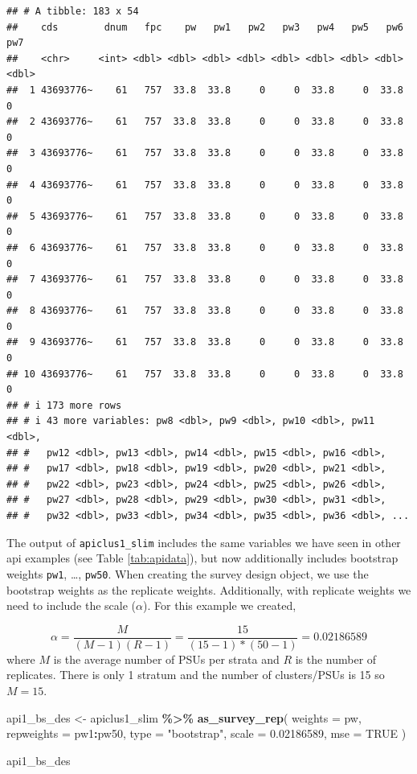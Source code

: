 \documentclass[
]{krantz}
\makeatletter
\newenvironment{Shaded}{\begin{snugshade}}{\end{snugshade}}
\newcommand{\AttributeTok}[1]{\textcolor[rgb]{0.27,0.27,0.27}{#1}}
\newcommand{\ConstantTok}[1]{\textcolor[rgb]{0.37,0.37,0.37}{#1}}
\newcommand{\FloatTok}[1]{\textcolor[rgb]{0.06,0.06,0.06}{#1}}
\newcommand{\FunctionTok}[1]{\textcolor[rgb]{0.27,0.27,0.27}{\textbf{#1}}}
\newcommand{\NormalTok}[1]{#1}
\newcommand{\OtherTok}[1]{\textcolor[rgb]{0.37,0.37,0.37}{#1}}
\newcommand{\SpecialCharTok}[1]{\textcolor[rgb]{0.43,0.43,0.43}{\textbf{#1}}}
\newcommand{\StringTok}[1]{\textcolor[rgb]{0.5,0.5,0.5}{#1}}
\newenvironment{kframe}{%
\medskip{}
\setlength{\fboxsep}{.8em}
 \def\at@end@of@kframe{}%
 \ifinner\ifhmode%
  \def\at@end@of@kframe{\end{minipage}}%
  \begin{minipage}{\columnwidth}%
 \fi\fi%
 \def\FrameCommand##1{\hskip\@totalleftmargin \hskip-\fboxsep
 \colorbox{shadecolor}{##1}\hskip-\fboxsep
     \hskip-\linewidth \hskip-\@totalleftmargin \hskip\columnwidth}%
 \MakeFramed {\advance\hsize-\width
   \@totalleftmargin\z@ \linewidth\hsize
   \@setminipage}}%
 {\par\unskip\endMakeFramed%
 \at@end@of@kframe}
\renewenvironment{Shaded}{\begin{kframe}}{\end{kframe}}
\makeatother
\begin{document}
\begin{verbatim}
## # A tibble: 183 x 54
##    cds        dnum   fpc    pw   pw1   pw2   pw3   pw4   pw5   pw6   pw7
##    <chr>     <int> <dbl> <dbl> <dbl> <dbl> <dbl> <dbl> <dbl> <dbl> <dbl>
##  1 43693776~    61   757  33.8  33.8     0     0  33.8     0  33.8     0
##  2 43693776~    61   757  33.8  33.8     0     0  33.8     0  33.8     0
##  3 43693776~    61   757  33.8  33.8     0     0  33.8     0  33.8     0
##  4 43693776~    61   757  33.8  33.8     0     0  33.8     0  33.8     0
##  5 43693776~    61   757  33.8  33.8     0     0  33.8     0  33.8     0
##  6 43693776~    61   757  33.8  33.8     0     0  33.8     0  33.8     0
##  7 43693776~    61   757  33.8  33.8     0     0  33.8     0  33.8     0
##  8 43693776~    61   757  33.8  33.8     0     0  33.8     0  33.8     0
##  9 43693776~    61   757  33.8  33.8     0     0  33.8     0  33.8     0
## 10 43693776~    61   757  33.8  33.8     0     0  33.8     0  33.8     0
## # i 173 more rows
## # i 43 more variables: pw8 <dbl>, pw9 <dbl>, pw10 <dbl>, pw11 <dbl>,
## #   pw12 <dbl>, pw13 <dbl>, pw14 <dbl>, pw15 <dbl>, pw16 <dbl>,
## #   pw17 <dbl>, pw18 <dbl>, pw19 <dbl>, pw20 <dbl>, pw21 <dbl>,
## #   pw22 <dbl>, pw23 <dbl>, pw24 <dbl>, pw25 <dbl>, pw26 <dbl>,
## #   pw27 <dbl>, pw28 <dbl>, pw29 <dbl>, pw30 <dbl>, pw31 <dbl>,
## #   pw32 <dbl>, pw33 <dbl>, pw34 <dbl>, pw35 <dbl>, pw36 <dbl>, ...
\end{verbatim}

The output of \texttt{apiclus1\_slim} includes the same variables we have seen in other api examples (see Table \ref{tab:apidata}), but now additionally includes bootstrap weights \texttt{pw1}, \ldots, \texttt{pw50}. When creating the survey design object, we use the bootstrap weights as the replicate weights. Additionally, with replicate weights we need to include the scale (\(\alpha\)). For this example we created,

\[\alpha=\frac{M}{(M-1)(R-1)}=\frac{15}{(15-1)*(50-1)}=0.02186589\]
where \(M\) is the average number of PSUs per strata and \(R\) is the number of replicates. There is only 1 stratum and the number of clusters/PSUs is 15 so \(M=15\).

\begin{Shaded}
\begin{Highlighting}[]
\NormalTok{api1\_bs\_des }\OtherTok{\textless{}{-}}\NormalTok{ apiclus1\_slim }\SpecialCharTok{\%\textgreater{}\%}
  \FunctionTok{as\_survey\_rep}\NormalTok{(}
    \AttributeTok{weights =}\NormalTok{ pw,}
    \AttributeTok{repweights =}\NormalTok{ pw1}\SpecialCharTok{:}\NormalTok{pw50,}
    \AttributeTok{type =} \StringTok{"bootstrap"}\NormalTok{,}
    \AttributeTok{scale =} \FloatTok{0.02186589}\NormalTok{,}
    \AttributeTok{mse =} \ConstantTok{TRUE}
\NormalTok{  )}

\NormalTok{api1\_bs\_des}
\end{Highlighting}
\end{Shaded}
\end{document}
